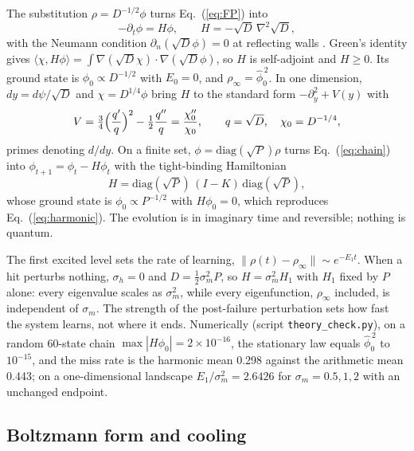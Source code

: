 \documentclass[pre,twocolumn,superscriptaddress,showpacs=false,amsmath,amssymb,nofootinbib]{revtex4-2}
\begin{document}
The substitution $\rho=D^{-1/2}\phi$ turns Eq.~(\ref{eq:FP}) into
\begin{equation}
-\partial_t\phi=H\phi,\qquad H=-\sqrt D\,\nabla^2\sqrt D ,
\label{eq:H}
\end{equation}
with the Neumann condition $\partial_n(\sqrt D\phi)=0$ at reflecting walls \cite{Risken1989}. Green's identity gives $\langle\chi,H\phi\rangle=\int\nabla(\sqrt D\chi)\cdot\nabla(\sqrt D\phi)$, so $H$ is self-adjoint and $H\ge0$. Its ground state is $\phi_0\propto D^{-1/2}$ with $E_0=0$, and $\rho_\infty=\hat\phi_0^{\,2}$. In one dimension, $dy=d\psi/\sqrt D$ and $\chi=D^{1/4}\phi$ bring $H$ to the standard form $-\partial_y^2+V(y)$ with
\begin{equation}
V=\tfrac34\Bigl(\frac{q'}{q}\Bigr)^2-\tfrac12\frac{q''}{q}=\frac{\chi_0''}{\chi_0},\qquad q=\sqrt D,\quad\chi_0=D^{-1/4},
\end{equation}
primes denoting $d/dy$. On a finite set, $\phi=\mathrm{diag}(\sqrt P)\rho$ turns Eq.~(\ref{eq:chain}) into $\phi_{t+1}=\phi_t-H\phi_t$ with the tight-binding Hamiltonian
\begin{equation}
H=\mathrm{diag}(\sqrt P)\,(I-K)\,\mathrm{diag}(\sqrt P),
\end{equation}
whose ground state is $\phi_0\propto P^{-1/2}$ with $H\phi_0=0$,
which reproduces Eq.~(\ref{eq:harmonic}). The evolution is in imaginary time and reversible; nothing is quantum.

The first excited level sets the rate of learning, $\|\rho(t)-\rho_\infty\|\sim e^{-E_1t}$. When a hit perturbs nothing, $\sigma_h=0$ and $D=\tfrac12\sigma_m^2P$, so $H=\sigma_m^2H_1$ with $H_1$ fixed by $P$ alone: every eigenvalue scales as $\sigma_m^2$, while every eigenfunction, $\rho_\infty$ included, is independent of $\sigma_m$. The strength of the post-failure perturbation sets how fast the system learns, not where it ends. Numerically (script \texttt{theory\_check.py}), on a random 60-state chain $\max|H\phi_0|=2\times10^{-16}$, the stationary law equals $\hat\phi_0^{\,2}$ to $10^{-15}$, and the miss rate is the harmonic mean 0.298 against the arithmetic mean 0.443; on a one-dimensional landscape $E_1/\sigma_m^2=2.6426$ for $\sigma_m=0.5,1,2$ with an unchanged endpoint.

\subsection{Boltzmann form and cooling}
\end{document}
